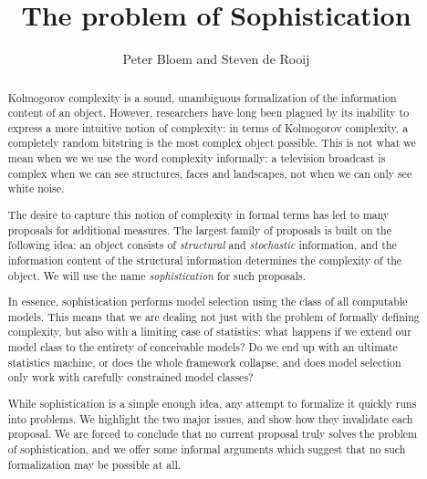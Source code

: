 \documentclass{style/llncs}
\title{The problem of Sophistication}
\author{Peter Bloem and Steven de Rooij}
\institute{
  System and Network Engineering Group, \\University of Amsterdam, the Netherlands\\
  \email{uva@peterbloem.nl, steven.de.rooij@gmail.com}
}
\begin{document}
 
\maketitle

\begin{abstract}
Kolmogorov complexity is a sound, unambiguous formalization of the information content of an object. However, researchers have long been plagued by its inability to express a more intuitive notion of complexity: in terms of Kolmogorov complexity, a completely random bitstring is the most complex object possible. This is not what we mean when we we use the word complexity informally: a television broadcast is complex when we can see structures, faces and landscapes, not when we can only see white noise. 

\hspace{0.05\textwidth} The desire to capture this notion of complexity in formal terms has led to many proposals for additional measures. The largest family of proposals is built on the following idea:  an object consists of \emph{structural} and \emph{stochastic} information, and the information content of the structural information determines the complexity of the object. We will use the name \emph{sophistication} for such proposals. 

\hspace{0.05\textwidth} In essence, sophistication performs model selection using the class of all computable models. This means that we are dealing not just with the problem of formally defining complexity, but also with a limiting case of statistics: what happens if we extend our model class to the entirety of conceivable models? Do we end up with an ultimate statistics machine, or does the whole framework collapse, and does model selection only work with carefully constrained model classes? 

\hspace{0.05\textwidth} While sophistication is a simple enough idea, any attempt to formalize it quickly runs into problems. We highlight the two major issues, and show how they invalidate each proposal. We are forced to conclude that no current proposal truly solves the problem of sophistication, and we offer some informal arguments which suggest that no such formalization may be possible at all.

\end{abstract}
\end{document}
